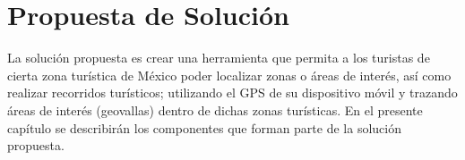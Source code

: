 \chapter{Propuesta de Solución}
La solución propuesta es crear una herramienta que permita a los turistas de cierta zona turística de México poder localizar zonas o áreas de interés, así como realizar recorridos turísticos; utilizando el GPS de su dispositivo móvil y trazando áreas de interés (geovallas) dentro de dichas zonas turísticas. En el presente capítulo se describirán los componentes que forman parte de la solución propuesta. 








